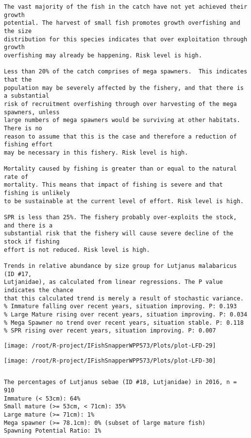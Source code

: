 \documentclass{report}\usepackage[]{graphicx}\usepackage[]{color}
\makeatletter
\def\maxwidth{ %
  \ifdim\Gin@nat@width>\linewidth
    \linewidth
  \else
    \Gin@nat@width
  \fi
}
\newenvironment{kframe}{%
 \def\at@end@of@kframe{}%
 \ifinner\ifhmode%
  \def\at@end@of@kframe{\end{minipage}}%
  \begin{minipage}{\columnwidth}%
 \fi\fi%
 \def\FrameCommand##1{\hskip\@totalleftmargin \hskip-\fboxsep
 \colorbox{shadecolor}{##1}\hskip-\fboxsep
     \hskip-\linewidth \hskip-\@totalleftmargin \hskip\columnwidth}%
 \MakeFramed {\advance\hsize-\width
   \@totalleftmargin\z@ \linewidth\hsize
   \@setminipage}}%
 {\par\unskip\endMakeFramed%
 \at@end@of@kframe}
\newenvironment{knitrout}{}{} %
\makeatother
\begin{document}
\begin{knitrout}
\begin{kframe}
\begin{verbatim}
The vast majority of the fish in the catch have not yet achieved their growth
potential. The harvest of small fish promotes growth overfishing and the size
distribution for this species indicates that over exploitation through growth
overfishing may already be happening. Risk level is high.

Less than 20% of the catch comprises of mega spawners.  This indicates that the
population may be severely affected by the fishery, and that there is a substantial
risk of recruitment overfishing through over harvesting of the mega spawners, unless
large numbers of mega spawners would be surviving at other habitats. There is no
reason to assume that this is the case and therefore a reduction of fishing effort
may be necessary in this fishery. Risk level is high.
 
Mortality caused by fishing is greater than or equal to the natural rate of
mortality. This means that impact of fishing is severe and that fishing is unlikely
to be sustainable at the current level of effort. Risk level is high.
 
SPR is less than 25%. The fishery probably over-exploits the stock, and there is a
substantial risk that the fishery will cause severe decline of the stock if fishing
effort is not reduced. Risk level is high.
 
Trends in relative abundance by size group for Lutjanus malabaricus (ID #17,
Lutjanidae), as calculated from linear regressions. The P value indicates the chance
that this calculated trend is merely a result of stochastic variance.
% Immature falling over recent years, situation improving. P: 0.193
% Large Mature rising over recent years, situation improving. P: 0.034
% Mega Spawner no trend over recent years, situation stable. P: 0.118
% SPR rising over recent years, situation improving. P: 0.007
\end{verbatim}
\end{kframe}
\texttt{[image: /root/R-project/IFishSnapperWPP573/Plots/plot-LFD-29]} 

\texttt{[image: /root/R-project/IFishSnapperWPP573/Plots/plot-LFD-30]} 
\begin{kframe}\begin{verbatim}
\end{verbatim}
\end{kframe}
\clearpage
\newpage
\begin{kframe}\begin{verbatim}The percentages of Lutjanus sebae (ID #18, Lutjanidae) in 2016, n = 910
Immature (< 53cm): 64%
Small mature (>= 53cm, < 71cm): 35%
Large mature (>= 71cm): 1%
Mega spawner (>= 78.1cm): 0% (subset of large mature fish)
Spawning Potential Ratio: 1%
 

\end{verbatim}
\end{kframe}
\end{knitrout}
\end{document}
